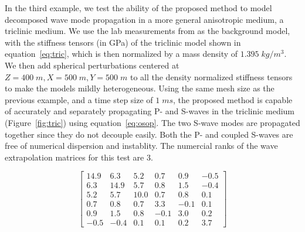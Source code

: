 
In the third example, we test the ability of the proposed method to model decomposed wave mode propagation in a more general anisotropic medium, a triclinic medium. We use the lab measurements from \cite{mah03} as the background model, with the stiffness tensors (in GPa) of the triclinic model shown in equation~\ref{eq:tric}, which is then normalized by a mass density of $1.395\;kg/m^3$. We then add spherical perturbations centered at $Z=400\;m, X=500\;m, Y=500\;m$ to all the density normalized stiffness tensors to make the models mildly heterogeneous. Using the same mesh size as the previous example, and a time step size of $1\;ms$, the proposed method is capable of accurately and separately propagating P- and S-waves in the triclinic medium (Figure~\ref{fig:tric}) using equation~\ref{eq:osop}. The two S-wave modes are propagated together since they do not decouple easily. Both the P- and coupled S-waves are free of numerical dispersion and instablity. The numercial ranks of the wave extrapolation matrices for this test are $3$.


\begin{equation}
\label{eq:tric}
\begin{bmatrix}
  14.9 & 6.3  & 5.2  & 0.7  & 0.9  & -0.5 \\
  6.3  & 14.9 & 5.7  & 0.8  & 1.5  & -0.4 \\
  5.2  & 5.7  & 10.0 & 0.7  & 0.8  & 0.1  \\
  0.7  & 0.8  & 0.7  & 3.3  & -0.1 & 0.1  \\
  0.9  & 1.5  & 0.8  & -0.1 & 3.0  & 0.2  \\
  -0.5 & -0.4 & 0.1  & 0.1  & 0.2  & 3.7
\end{bmatrix}
\end{equation}

